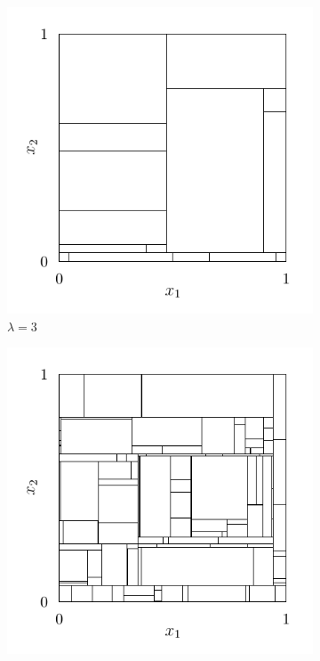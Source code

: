 \begin{figure}[t]
  \centering
  \begin{subfigure}{0.32\textwidth}
    \centering
    \includegraphics[scale=0.64]{graphics/plot_mondrian_process_1.pdf}
    \caption{$\lambda = 3$}
  \end{subfigure}
  \begin{subfigure}{0.32\textwidth}
    \centering
    \includegraphics[scale=0.64]{graphics/plot_mondrian_process_2.pdf}

\end{subfigure}
\end{figure}
